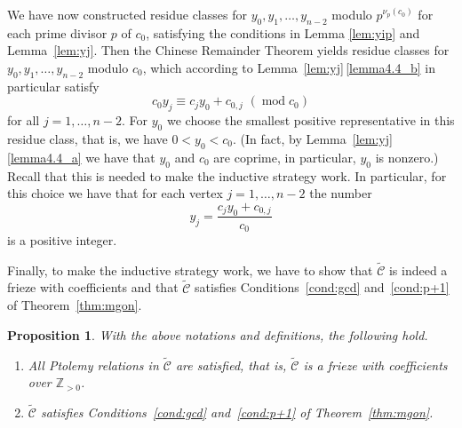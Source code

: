 \documentclass[10pt]{amsart}
\numberwithin{equation}{section}
\newtheorem{prop}[theo]{Proposition}
\theoremstyle{definition}
\theoremstyle{remark}
\DeclareMathOperator{\md}{mod}
\begin{document}
We have now constructed 
residue classes for $y_0,y_1,\ldots, y_{n-2}$ modulo $p^{\nu_p(c_0)}$
for each prime divisor $p$ of $c_0$, satisfying the conditions in Lemma 
\ref{lem:yip} and Lemma~\ref{lem:yj}. 
Then the Chinese Remainder Theorem 
yields residue classes for $y_0,y_1,\ldots, y_{n-2}$ modulo $c_0$,
which according to Lemma~\ref{lem:yj}\,\ref{lemma4.4_b} in particular satisfy
\[
c_0y_j \equiv c_jy_0 + c_{0,j}\,\,(\md c_0)
\]
for all $j=1,\ldots,n-2$. For $y_0$ we choose 
the smallest positive representative in this residue class, that is, we
have $0< y_0 < c_0$. (In fact, by Lemma~\ref{lem:yj}\,\ref{lemma4.4_a} we have that
$y_0$ and $c_0$ are coprime, in particular, $y_0$ is nonzero.) 
Recall that this is needed to make the inductive strategy work. 
In particular, for this choice we have that for each vertex $j=1,\ldots, n-2$ the 
number 
\begin{equation} \label{eq:yj}
 y_j = \frac{c_jy_0 + c_{0,j}}{c_0}
 \end{equation}
is a positive integer. 

Finally, to make the inductive strategy work, we have to show that 
$\widetilde{\mathcal{C}}$ is indeed a frieze with coefficients and that 
$\widetilde{\mathcal{C}}$ satisfies Conditions~\eqref{cond:gcd} and~\eqref{cond:p+1} of Theorem~\ref{thm:mgon}. 


\begin{prop}
With the above notations and definitions, the following hold.
\begin{enumerate}[label=(\alph*)]
 \item\label{prop4.5_a} %
 All Ptolemy relations in 
$\widetilde{\mathcal{C}}$ are satisfied, that is, $\widetilde{\mathcal{C}}$
is a frieze with coefficients over $\mathbb{Z}_{>0}$.
\item\label{prop4.5_b} %
$\widetilde{\mathcal{C}}$ satisfies Conditions~\eqref{cond:gcd} and~\eqref{cond:p+1} of Theorem~\ref{thm:mgon}. 
\end{enumerate}
\end{prop}
\end{document}

